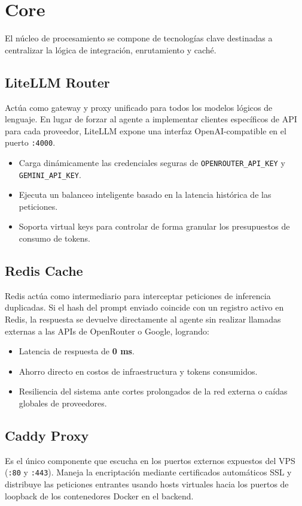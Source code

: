 \documentclass[12pt,a4paper,openany]{book}
\newcommand{\code}[1]{\texttt{\small#1}}
\newcommand{\port}[1]{\texttt{:#1}}
\newcommand{\latency}[1]{\textbf{\color{greenok}#1}}
\begin{document}
\chapter{Core}
El núcleo de procesamiento se compone de tecnologías clave destinadas a centralizar la lógica de integración, enrutamiento y caché.

\section{LiteLLM Router}
Actúa como gateway y proxy unificado para todos los modelos lógicos de lenguaje. En lugar de forzar al agente a implementar clientes específicos de API para cada proveedor, LiteLLM expone una interfaz OpenAI-compatible en el puerto \port{4000}.
\begin{itemize}
    \item Carga dinámicamente las credenciales seguras de \code{OPENROUTER\_API\_KEY} y \code{GEMINI\_API\_KEY}.
    \item Ejecuta un balanceo inteligente basado en la latencia histórica de las peticiones.
    \item Soporta virtual keys para controlar de forma granular los presupuestos de consumo de tokens.
\end{itemize}

\section{Redis Cache}
Redis actúa como intermediario para interceptar peticiones de inferencia duplicadas. Si el hash del prompt enviado coincide con un registro activo en Redis, la respuesta se devuelve directamente al agente sin realizar llamadas externas a las APIs de OpenRouter o Google, logrando:
\begin{itemize}
    \item Latencia de respuesta de \latency{0 ms}.
    \item Ahorro directo en costos de infraestructura y tokens consumidos.
    \item Resiliencia del sistema ante cortes prolongados de la red externa o caídas globales de proveedores.
\end{itemize}

\section{Caddy Proxy}
Es el único componente que escucha en los puertos externos expuestos del VPS (\port{80} y \port{443}). Maneja la encriptación mediante certificados automáticos SSL y distribuye las peticiones entrantes usando hosts virtuales hacia los puertos de loopback de los contenedores Docker en el backend.
\end{document}
